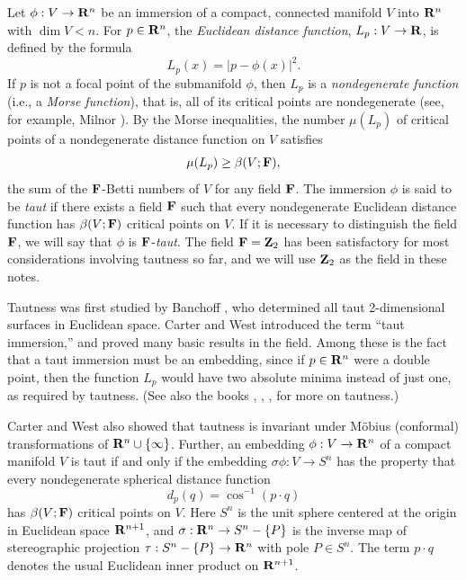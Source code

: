 \documentclass[12pt]{article}
\begin{document}
Let $\phi:V \rightarrow {\bf R}^n$ be an immersion of a compact, connected manifold $V$ into ${\bf R}^n$
with $\dim V < n$.  For
$p \in {\bf R}^n$, the {\em Euclidean distance function}, $L_p:V \rightarrow {\bf R}$, is defined by the formula
\begin{displaymath}
L_p(x) = |p - \phi(x)|^2.
\end{displaymath}
If $p$ is not a focal point of the submanifold $\phi$, then $L_p$ is a
{\em nondegenerate function}
(i.e., a {\em Morse function}), 
that is, all of its critical points are nondegenerate
(see, for example, Milnor \cite[pp. 32--38]{Mil}).  By the Morse inequalities, 
the number $\mu (L_p)$ of critical points of a
nondegenerate distance function on $V$ satisfies 
\begin{displaymath}
\mu (L_p) \geq \beta (V;{\bf F}), 
\end{displaymath}
the sum of the 
${\bf F}$-Betti numbers 
of $V$ for any field ${\bf F}$.  The immersion $\phi$ is said to be {\em taut} if there exists a field ${\bf F}$
such that every nondegenerate Euclidean distance function has $\beta (V;{\bf F})$ critical points on $V$.  If it is
necessary to distinguish the field ${\bf F}$, we will say that $\phi$ is ${\bf F}$-{\em taut}.  The field
${\bf F} = {\bf Z}_2$ has been satisfactory for most considerations involving tautness
so far, and we will use ${\bf Z}_2$ as the
field in these notes.

Tautness was first studied by Banchoff \cite{Ban1}, who determined all taut 
2-dimensional surfaces in Euclidean space.  Carter and West
\cite{CW1} introduced the term ``taut immersion,'' and
proved many basic results in the field.  Among these is the fact that a taut immersion
must be an embedding, 
since if $p \in {\bf R}^n$ were a double point, then the function $L_p$ would have two
absolute minima instead of just one, as required by tautness.  (See also the books \cite{CR7}, \cite{CR8},
\cite{CC3}, for more on tautness.)

Carter and West \cite{CW1} also showed that tautness is invariant under M\"{o}bius (conformal) transformations 
of ${\bf R}^n \cup \{\infty \}$.  Further, an embedding
$\phi:V \rightarrow {\bf R}^n$ of a compact manifold $V$ is taut if and only if the embedding
$\sigma \phi:V \rightarrow S^n$ has the property that every nondegenerate 
spherical distance function 
\begin{equation}
\label{eq:spherical-dist-fn}
d_p (q) = \cos^{-1} (p \cdot q)
\end{equation}
has $\beta (V;{\bf F})$ critical points on $V$.  Here $S^n$ is the unit sphere centered at the origin in Euclidean space
${\bf R}^{n+1}$, and $\sigma: {\bf R}^n \rightarrow S^n - \{P\}$ is the inverse map of 
stereographic projection $\tau:S^n - \{P\} \rightarrow  {\bf R}^n$
with pole $P \in S^n$. The term $p \cdot q$ denotes the usual Euclidean inner product on 
${\bf R}^{n+1}$.
\end{document}
